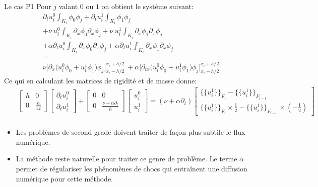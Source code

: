 \begin{frame}{Le cas P1}
Pour $j$ valant $0$ ou $1$ on obtient le système suivant:
\begin{eqnarray*}\label{EDP_RS_Formulation_Faible_P1}
  &\partial_t u_i^0 \displaystyle{\int_{K_i}}  \phi_0 \phi_j + \partial_t u_i^1 \displaystyle{\int_{K_i}}   \phi_1 \phi_j& \\
   &+\nu \ u_i^0  \displaystyle{\int_{K_i}} \partial_{x}\phi_0 \partial_{x}\phi_j  + \nu \ u_i^1 \displaystyle{\int_{K_i}} \partial_{x}\phi_1 \partial_{x}\phi_j& \\
   &+ \alpha \partial_{t}u_i^0 \displaystyle{\int_{K_i}}  \partial_{x}\phi_0\partial_{x}\phi_j + \alpha \partial_{t}u_i^1 \displaystyle{\int_{K_i}}  \partial_{x}\phi_1\partial_{x}\phi_j &\\
    &=& \\ 
    &\nu \Big[\partial_{x}\big(u_i^0\phi_0 +u_i^1\phi_1 \big) \phi_j  \Big]^{x_i +h/2}_{x_i - h/2} \ + \alpha \Big[\partial_{tx}\big(u_i^0\phi_0 +u_i^1\phi_1 \big) \phi_j \Big]^{x_i +h/2}_{x_i - h/2} 
\end{eqnarray*}
Ce qui en calculant les matrices de rigidité et de masse donne:
\begin{eqnarray*}
    &&\begin{bmatrix}
        h & 0 \\
        0 & \frac{h}{12} 
    \end{bmatrix}
    \begin{bmatrix}
    \partial_t u_i^0 \\
    \partial_t u_i^1    
    \end{bmatrix}
    +
        \begin{bmatrix}
        0 & 0 \\
        0 & \frac{\nu + \alpha \partial_t}{h} 
    \end{bmatrix}
    \begin{bmatrix}
    u_i^0 \\
    u_i^1    
    \end{bmatrix}
    = (\nu + \alpha\partial_t)
    \begin{bmatrix}
    \{\!\!\{ u_i^1 \}\!\!\}_{F_i} - \{\!\!\{ u_i^1 \}\!\!\}_{F_{i-1}}\\
    \{\!\!\{ u_i^1 \}\!\!\}_{F_i} \times\frac{1}{2} - \{\!\!\{ u_i^1 \}\!\!\}_{F_{i-1}} \times (- \frac{1}{2})
    \end{bmatrix} \\
\end{eqnarray*}
\end{frame}

\begin{frame}
    \begin{itemize}
        \item Les problèmes de second grade doivent traiter de façon plus subtile le flux numérique.
        \item La méthode reste naturelle pour traiter ce genre de problème. Le terme $\alpha$ permet de régulariser les phénomènes de chocs qui entraînent une diffusion numérique pour cette méthode.
    \end{itemize}
\end{frame}